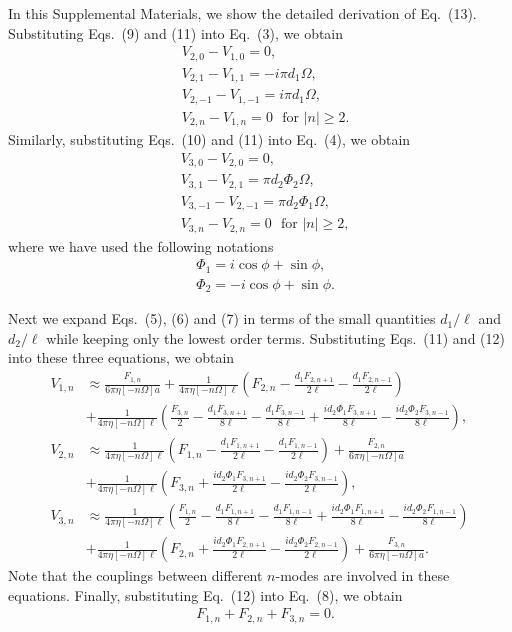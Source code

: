 \documentclass[nofootinbib,twocolumn,showpacs,preprintnumbers,pre,aps]{revtex4-1}
\begin{document}
In this Supplemental Materials, we show the detailed derivation of Eq.~(13).
Substituting Eqs.~(9) and (11) into Eq.~(3), we obtain 
\begin{align}
&V_{2,0}-V_{1,0}=0, \\
&V_{2,1}-V_{1,1}=-i\pi d_1\Omega, \\
&V_{2,-1}-V_{1,-1}=i\pi d_1\Omega, \\
&V_{2,n}-V_{1,n}=0~~~\text{for $|n| \ge 2$}.
\label{eq1veT}
\end{align}
Similarly, substituting Eqs.~(10) and (11) into Eq.~(4), we obtain
\begin{align}
&V_{3,0}-V_{2,0}=0, \\
&V_{3,1}-V_{2,1}=\pi d_2\Phi_2\Omega, \\
&V_{3,-1}-V_{2,-1}=\pi d_2\Phi_1\Omega, \\
&V_{3,n}-V_{2,n}=0~~~\text{for $|n| \ge 2$}, 
\label{eq2veT}
\end{align}
where we have used the following notations
\begin{align}
&\Phi_1=i\cos\phi+\sin\phi, \\
&\Phi_2=-i\cos\phi+\sin\phi.
\end{align}


Next we expand Eqs.~(5), (6) and (7) in terms of the small quantities 
$d_1/\ell$ and $d_2/\ell$ while keeping only the lowest order terms. 
Substituting Eqs.~(11) and (12) into these three equations, we obtain
\begin{align}
V_{1,n}& \approx \frac{F_{1,n}}{6\pi\eta[-n\Omega] a}+\frac{1}{4\pi\eta[-n\Omega]\ell}\left(F_{2,n}-\frac{d_1F_{2,n+1}}{2\ell}-\frac{d_1F_{2,n-1}}{2\ell}\right)\nonumber\\
&+\frac{1}{4\pi\eta[-n\Omega]\ell}\left(\frac{F_{3,n}}{2}-\frac{d_1F_{3,n+1}}{8\ell}-\frac{d_1F_{3,n-1}}{8\ell}+\frac{id_2\Phi_1F_{3,n+1}}{8\ell}-\frac{id_2\Phi_2F_{3,n-1}}{8\ell}\right),
\label{eq3veT}\\
V_{2,n}& \approx \frac{1}{4\pi\eta[-n\Omega]\ell}\left(F_{1,n}-\frac{d_1F_{1,n+1}}{2\ell}-\frac{d_1F_{1,n-1}}{2\ell}\right)+\frac{F_{2,n}}{6\pi\eta[-n\Omega] a}\nonumber\\
&+\frac{1}{4\pi\eta[-n\Omega] \ell}\left(F_{3,n}+\frac{id_2\Phi_1F_{3,n+1}}{2\ell}-\frac{id_2\Phi_2F_{3,n-1}}{2\ell}\right),
\label{eq4veT}\\
V_{3,n}& \approx \frac{1}{4\pi\eta[-n\Omega]\ell }\left(\frac{F_{1,n}}{2}-\frac{d_1F_{1,n+1}}{8\ell}-\frac{d_1F_{1,n-1}}{8\ell}+\frac{id_2\Phi_1F_{1,n+1}}{8\ell}-\frac{id_2\Phi_2F_{1,n-1}}{8\ell}\right)\nonumber\\
&+\frac{1}{4\pi\eta[-n\Omega]\ell }\left(F_{2,n}+\frac{id_2\Phi_1F_{2,n+1}}{2\ell}-\frac{id_2\Phi_2F_{2,n-1}}{2\ell}\right)+\frac{F_{3,n}}{6\pi\eta[-n\Omega] a}.
\label{eq5veT}
\end{align}
Note that the couplings between different $n$-modes are involved in these equations.
Finally, substituting Eq.~(12) into Eq.~(8), we obtain
\begin{align}
\label{eq6veT}
&F_{1,n}+F_{2,n}+F_{3,n}=0.
\end{align}
\end{document}
